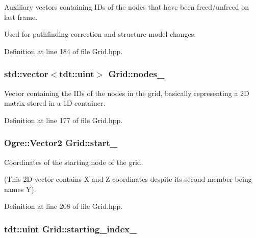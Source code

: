 Auxiliary vectors containing I\+Ds of the nodes that have been freed/unfreed on last frame. 

Used for pathfinding correction and structure model changes. 

Definition at line 184 of file Grid.\+hpp.

\subsubsection[{\texorpdfstring{nodes\+\_\+}{nodes_}}]{\setlength{\rightskip}{0pt plus 5cm}std\+::vector$<$tdt\+::uint$>$ Grid\+::nodes\+\_\+\hspace{0.3cm}{\ttfamily [private]}}\hypertarget{class_grid_a8727a9b7b5f21d30b6e3f9c7468dc305}{}\label{class_grid_a8727a9b7b5f21d30b6e3f9c7468dc305}


Vector containing the I\+Ds of the nodes in the grid, basically representing a 2D matrix stored in a 1D container. 



Definition at line 177 of file Grid.\+hpp.

\subsubsection[{\texorpdfstring{start\+\_\+}{start_}}]{\setlength{\rightskip}{0pt plus 5cm}Ogre\+::\+Vector2 Grid\+::start\+\_\+\hspace{0.3cm}{\ttfamily [private]}}\hypertarget{class_grid_aedee2f3e6f46e677b462c8301572e894}{}\label{class_grid_aedee2f3e6f46e677b462c8301572e894}


Coordinates of the starting node of the grid. 

(This 2D vector contains X and Z coordinates despite it\textquotesingle{}s second member being names Y). 

Definition at line 208 of file Grid.\+hpp.

\subsubsection[{\texorpdfstring{starting\+\_\+index\+\_\+}{starting_index_}}]{\setlength{\rightskip}{0pt plus 5cm}tdt\+::uint Grid\+::starting\+\_\+index\+\_\+\hspace{0.3cm}{\ttfamily [private]}}\hypertarget{class_grid_adf871683c5c3e983ba1dc7ddf2a45c4e}{}\label{class_grid_adf871683c5c3e983ba1dc7ddf2a45c4e}



